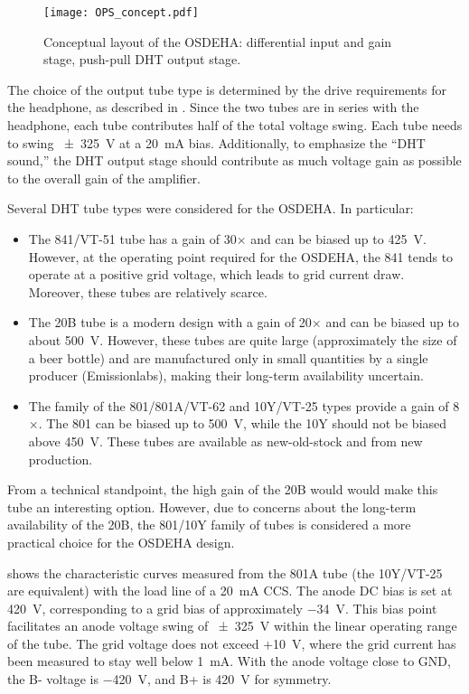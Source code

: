 \begin{figure}
\begin{center}
\texttt{[image: OPS\_concept.pdf]}
\caption{Conceptual layout of the OSDEHA: differential input and gain stage, push-pull DHT output stage.}
\end{center}
\end{figure}

The choice of the output tube type is determined by the drive requirements for the headphone, as described in . Since the two tubes are in series with the headphone, each tube contributes half of the total voltage swing. Each tube needs to swing \SI{\pm325}{V} at a \SI{20}{mA} bias. Additionally, to emphasize the ``DHT sound,'' the DHT output stage should contribute as much voltage gain as possible to the overall gain of the amplifier.

Several DHT tube types were considered for the OSDEHA\cite{osdeha_p9,osdeha_whichDHT}. In particular:

\begin{itemize}
\item The 841/VT-51 tube has a gain of 30$\times$ and can be biased up to \SI{425}{V}. However, at the operating point required for the OSDEHA, the 841 tends to operate at a positive grid voltage, which leads to grid current draw. Moreover, these tubes are relatively scarce.
\item The 20B tube is a modern design with a gain of 20$\times$ and can be biased up to about \SI{500}{V}. However, these tubes are quite large (approximately the size of a beer bottle) and are manufactured only in small quantities by a single producer (Emissionlabs), making their long-term availability uncertain.
\item The family of the 801/801A/VT-62 and 10Y/VT-25 types\cite{aasyl_801types} provide a gain of 8$\times$. The 801 can be biased up to \SI{500}{V}, while the 10Y should not be biased above \SI{450}{V}. These tubes are available as new-old-stock and from new production.
\end{itemize}

From a technical standpoint, the high gain of the 20B would would make this tube an interesting option. However, due to concerns about the long-term availability of the 20B, the 801/10Y family of tubes is considered a more practical choice for the OSDEHA design.

 shows the characteristic curves measured from the 801A tube (the 10Y/VT-25 are equivalent) with the load line of a \SI{20}{mA} CCS. The anode DC bias is set at \SI{420}{V}, corresponding to a grid bias of approximately \SI{-34}{V}. This bias point facilitates an anode voltage swing of \SI{\pm325}{V} within the linear operating range of the tube. The grid voltage does not exceed +\SI{10}{V}, where the grid current has been measured to stay well below \SI{1}{mA}. With the anode voltage close to GND, the B- voltage is \SI{-420}{V}, and B+ is \SI{+420}{V} for symmetry.

